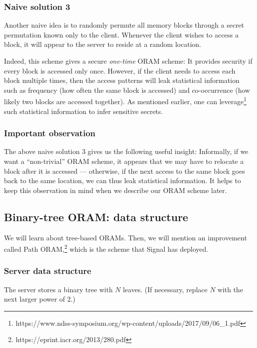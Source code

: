 \subsubsection{Naive solution 3}\label{naive-solution-3.}

Another naive idea is to randomly permute all memory blocks through a
secret permutation known only to the client. Whenever the client wishes
to access a block, it will appear to the server to reside at a random
location.

Indeed, this scheme gives a secure \emph{one-time} ORAM scheme: It
provides security if every block is accessed only once. However, if the
client needs to access each block multiple times, then the access
patterns will leak statistical information such as frequency (how often
the same block is accessed) and co-occurrence (how likely two blocks are
accessed together). As mentioned earlier, one can leverage\footnote{https://www.ndss-symposium.org/wp-content/uploads/2017/09/06\_1.pdf}
such statistical information to infer sensitive secrets.

\subsubsection{Important observation}\label{important-observation.}

The above naive solution 3 gives us the following useful insight:
Informally, if we want a ``non-trivial'' ORAM scheme, it appears that we
may have to relocate a block after it is accessed --- otherwise, if the
next access to the same block goes back to the same location, we can
thus leak statistical information. It helps to keep this observation in
mind when we describe our ORAM scheme later.

\subsection{Binary-tree ORAM: data structure}\label{data-structure}

We will learn about tree-based ORAMs. Then, we will mention an
improvement called Path ORAM,\footnote{https://eprint.iacr.org/2013/280.pdf}
which is the scheme that Signal has deployed.

\subsubsection{Server data structure}\label{server-data-structure.}

The server stores a binary tree with \(N\) leaves. (If necessary,
replace \(N\) with the next larger power of \(2\).)

